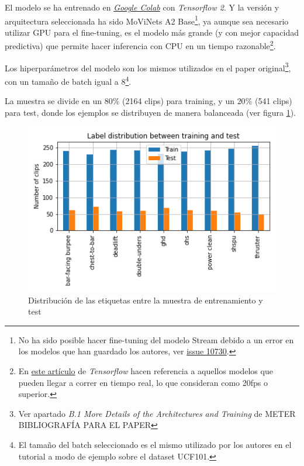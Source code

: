 El modelo se ha entrenado en \href{https://colab.research.google.com/?hl=es}{\textit{Google Colab}} con \textit{Tensorflow 2}. Y la versión y arquitectura seleccionada ha sido MoViNets A2 Base\footnote{No ha sido posible hacer fine-tuning del modelo Stream debido a un error en los modelos que han guardado los autores, ver \href{https://github.com/tensorflow/models/issues/10730}{issue 10730}.}, ya aunque sea necesario utilizar GPU para el fine-tuning, es el modelo más grande (y con mejor capacidad predictiva) que permite hacer inferencia con CPU en un tiempo razonable\footnote{En \href{https://blog.tensorflow.org/2022/04/video-classification-on-edge-devices.html}{este artículo} de \textit{Tensorflow} hacen referencia a aquellos modelos que pueden llegar a correr en tiempo real, lo que consideran como 20fps o superior.}.

Los hiperparámetros del modelo son los mismos utilizados en el paper original\footnote{Ver apartado \textit{B.1 More Details of the Architectures and Training} de METER BIBLIOGRAFÍA PARA EL PAPER}, con un tamaño de batch igual a 8\footnote{El tamaño del batch seleccionado es el mismo utilizado por los autores en el tutorial a modo de ejemplo sobre el dataset UCF101.}.

La muestra se divide en un $80\%$ (2164 clips) para training, y un $20\%$ (541 clips) para test, donde los ejemplos se distribuyen de manera balanceada (ver figura \ref{sample_sizes}).

\begin{figure}[H]
    \centering
		\includegraphics[width=\textwidth]{figs/sample_sizes.png}
\caption{Distribución de las etiquetas entre la muestra de entrenamiento y test}\label{sample_sizes}
\end{figure}

